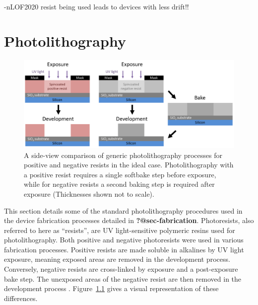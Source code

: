 \documentclass[
  a4paper,
]{scrbook}
\begin{document}
-nLOF2020 resist being used leads to devices with less drift!!

\appendix
{}

\hypertarget{sec-photolithography}{%
\chapter{Photolithography}\label{sec-photolithography}}

\begin{figure}

{\centering \includegraphics{./figures/app1/positive-negative-photolithography.png}

}

\caption{\label{fig-photolithography-types}A side-view comparison of
generic photolithography processes for positive and negative resists in
the ideal case. Photolithography with a positive resist requires a
single softbake step before exposure, while for negative resists a
second baking step is required after exposure (Thicknesses shown not to
scale).}

\end{figure}

This section details some of the standard photolithography procedures
used in the device fabrication processes detailed in
\textbf{?@sec-fabrication}. Photoresists, also referred to here as
``resists'', are UV light-sensitive polymeric resins used for
photolithography. Both positive and negative photoresists were used in
various fabrication processes. Positive resists are made soluble in
alkalines by UV light exposure, meaning exposed areas are removed in the
development process. Conversely, negative resists are cross-linked by
exposure and a post-exposure bake step. The unexposed areas of the
negative resist are then removed in the development process
\autocite{Microchemicals}. Figure~\ref{fig-photolithography-types} gives
a visual representation of these differences.
\end{document}
